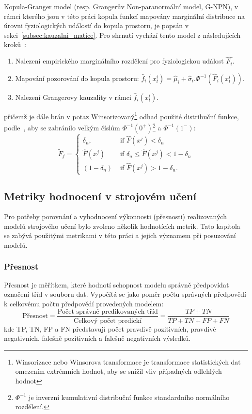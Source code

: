 Kopula-Granger model (resp. Grangerův Non-paranormální model, G-NPN), v rámci
kterého jsou v této práci kopula funkcí mapovány marginální distribuce na úrovni
fyziologických událostí do kopula prostoru, je popsán v
sekci~\ref{subsec:kauzalni_matice}. Pro shrnutí vychází tento model z
následujících kroků~\cite{Guy2016}:
\begin{enumerate}
    \item Nalezení empirického marginálního rozdělení pro fyziologickou událost
          $\hat{F_i}$.
    \item Mapování pozorování do kopula prostoru:
          $\hat{f}_i\left(x_t^i\right)=\hat{\mu}_i+\hat{\sigma}_i.
              \Phi^{-1}\left(\hat{F}_i\left(x_t^i\right)\right)$.
    \item Nalezení Grangerovy kauzality v rámci $\hat{f}_i\left(x_t^i\right)$.
\end{enumerate}
přičemž je dále brán v potaz Winsorizovaný\footnote{Winsorizace nebo Winsorova
transformace je transformace statistických dat omezením extrémních hodnot,
aby se snížil vliv případných odlehlých hodnot} odhad použité distribuční
funkce, podle~\cite{Bahadori2013}, aby se zabránilo velkým číslům
$\Phi^{-1}\left(0^{+}\right)$\footnote{$\Phi^{-1}$ je inverzní kumulativní
distribuční funkce standardního normálního rozdělení.} a
$\Phi^{-1}\left(1^{-}\right)$:
\begin{equation}
    \tilde{F}_j= \begin{cases}\delta_n, & \text { if } \hat{F}\left(x^j\right)<\delta_n \\ \hat{F}\left(x^j\right) & \text { if } \delta_n \leq \hat{F}\left(x^j\right)<1-\delta_n \\ \left(1-\delta_n\right) & \text { if } \hat{F}\left(x^j\right)>1-\delta_n .\end{cases}
\end{equation}

\subsection{Metriky hodnocení v strojovém učení}
\label{subsec:ml_metriky}
Pro potřeby porovnání a vyhodnocení výkonnosti (přesnosti) realizovaných modelů
strojového učení bylo zvoleno několik hodnotících metrik. Tato kapitola se
zabývá použitými metrikami v této práci a jejich významem při posuzování modelů.

\subsubsection{Přesnost}
Přesnost je měřítkem, které hodnotí schopnost modelu správně předpovídat
označení tříd v souboru dat. Vypočítá se jako poměr počtu správných předpovědí k
celkovému počtu předpovědí provedených modelem:
\begin{equation}
    \text{Přesnost} = \frac{\text{Počet správně predikovaných tříd}}{\text{Celkový počet predickí}} = \frac{TP + TN}{TP + TN + FP + FN}
\end{equation}
kde TP, TN, FP a FN představují počet pravdivě pozitivních, pravdivě
negativních, falešně pozitivních a falešně negativních výsledků.

